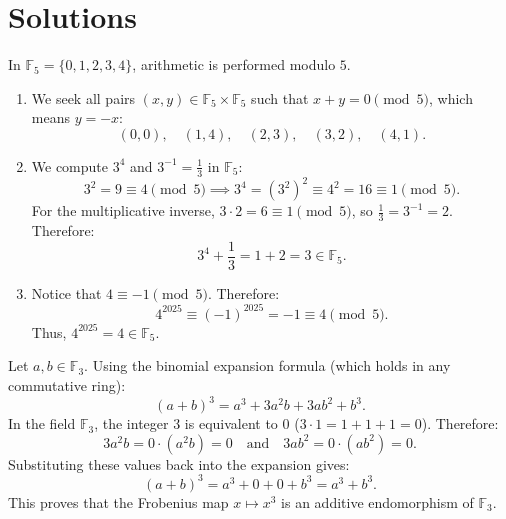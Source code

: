 \section{Solutions}\label{sec:solutions_fields}

\begin{exercisesolution*}
\label{sol:finite_field_f5_arithmetic}
In $\mathbb{F}_5 = \{0, 1, 2, 3, 4\}$, arithmetic is performed modulo $5$.
\begin{enumerate}[label=\textbf{(\alph*)}]
    \item We seek all pairs $(x, y) \in \mathbb{F}_5 \times \mathbb{F}_5$ such that $x + y = 0 \pmod 5$, which means $y = -x$:
    \[
    (0, 0), \quad (1, 4), \quad (2, 3), \quad (3, 2), \quad (4, 1).
    \]

    \item We compute $3^4$ and $3^{-1} = \frac{1}{3}$ in $\mathbb{F}_5$:
    \[
    3^2 = 9 \equiv 4 \pmod 5 \implies 3^4 = (3^2)^2 \equiv 4^2 = 16 \equiv 1 \pmod 5.
    \]
    For the multiplicative inverse, $3 \cdot 2 = 6 \equiv 1 \pmod 5$, so $\frac{1}{3} = 3^{-1} = 2$. Therefore:
    \[
    3^4 + \frac{1}{3} = 1 + 2 = 3 \in \mathbb{F}_5.
    \]

    \item Notice that $4 \equiv -1 \pmod 5$. Therefore:
    \[
    4^{2025} \equiv (-1)^{2025} = -1 \equiv 4 \pmod 5.
    \]
    Thus, $4^{2025} = 4 \in \mathbb{F}_5$.
\end{enumerate}
\end{exercisesolution*}

\begin{exercisesolution}
\label{sol:frobenius_f3}
Let $a, b \in \mathbb{F}_3$. Using the binomial expansion formula (which holds in any commutative ring):
\[
(a + b)^3 = a^3 + 3a^2b + 3ab^2 + b^3.
\]
In the field $\mathbb{F}_3$, the integer $3$ is equivalent to $0$ ($3 \cdot 1 = 1 + 1 + 1 = 0$). Therefore:
\[
3a^2b = 0 \cdot (a^2b) = 0 \quad \text{and} \quad 3ab^2 = 0 \cdot (ab^2) = 0.
\]
Substituting these values back into the expansion gives:
\[
(a + b)^3 = a^3 + 0 + 0 + b^3 = a^3 + b^3.
\]
This proves that the Frobenius map $x \mapsto x^3$ is an additive endomorphism of $\mathbb{F}_3$.
\end{exercisesolution}

